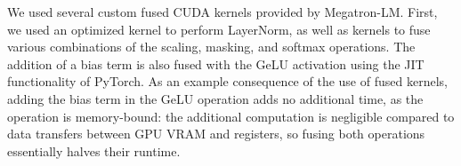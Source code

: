 \documentclass[twoside,11pt]{article}
\begin{document}
We used several custom fused CUDA kernels provided by Megatron-LM. First, we used an optimized kernel to perform LayerNorm, as well as kernels to fuse various combinations of the scaling, masking, and softmax operations. The addition of a bias term is also fused with the GeLU activation using the JIT functionality of PyTorch. As an example consequence of the use of fused kernels, adding the bias term in the GeLU operation adds no additional time, as the operation is memory-bound: the additional computation is negligible compared to data transfers between GPU VRAM and registers, so fusing both operations essentially halves their runtime.





\end{document}
